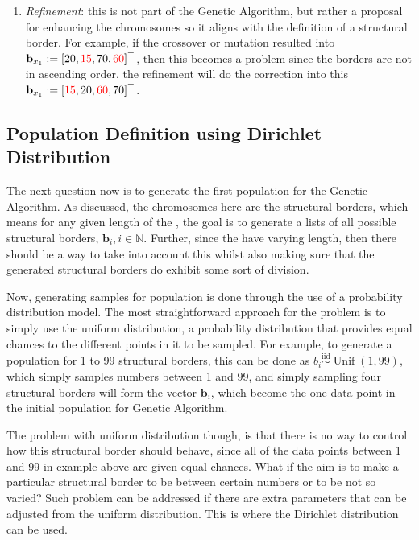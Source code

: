 \begin{enumerate}
    \item \textit{Refinement}: this is not part of the Genetic Algorithm, but rather a proposal for enhancing the chromosomes so it aligns with the definition of a structural border. For example, if the crossover or mutation resulted into $\mathbf{b}_{x_1}:=[20,\textcolor{red}{15},70,\textcolor{red}{60}]^{\top}$, then this becomes a problem since the borders are not in ascending order, the refinement will do the correction into this $\mathbf{b}_{x_1}:=[\textcolor{red}{15}, 20,\textcolor{red}{60},\newline 70]^{\top}$.
\end{enumerate}
\subsection{Population Definition using Dirichlet Distribution}
The next question now is to generate the first population for the Genetic Algorithm. As discussed, the chromosomes here are the structural borders, which means for any given length of the  , the goal is to generate a lists of all possible structural borders, $\mathbf{b}_i, i\in\mathbb{N}$. Further, since the   have varying length, then there should be a way to take into account this whilst also making sure that the generated structural borders do exhibit some sort of division.

Now, generating samples for population is done through the use of a probability distribution model. The most straightforward approach for the problem is to simply use the uniform distribution, a probability distribution that provides equal chances to the different points in it to be sampled. For example, to generate a population for 1 to 99 structural borders, this can be done as $b_i\overset{\text{iid}}{\sim}\operatorname{Unif}(1,99)$, which simply samples numbers between 1 and 99, and simply sampling four structural borders will form the vector $\mathbf{b}_i$, which become the one data point in the initial population for Genetic Algorithm.

The problem with uniform distribution though, is that there is no way to control how this structural border should behave, since all of the data points between 1 and 99 in example above are given equal chances. What if the aim is to make a particular structural border to be between certain numbers or to be not so varied? Such problem can be addressed if there are extra parameters that can be adjusted from the uniform distribution. This is where the Dirichlet distribution can be used.

